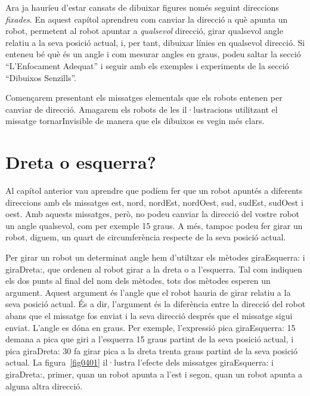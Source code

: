 Ara ja hauríeu d'estar cansats de dibuixar figures només seguint direccions \emph{fixades}. En aquest capítol aprendreu com canviar la direcció a què apunta un robot, permetent al robot apuntar a \emph{qualsevol} direcció, girar qualsevol angle relatiu a la seva posició actual, i, per tant, dibuixar línies en qualsevol direcció. Si enteneu bé què és un angle i com mesurar angles en graus, podeu saltar la secció ``L'Enfocament Adequat'' i seguir amb els exemples i experiments de la secció ``Dibuixos Senzills''.

Començarem presentant els missatges elementals que els robots entenen per canviar de direcció. Amagarem els robots de les il·lustracions utilitzant el missatge \textsf{tornarInvisible} de manera que els dibuixos es vegin més clars.

\section{Dreta o esquerra?}
Al capítol anterior vau aprendre que podíem fer que un robot apuntés a diferents direccions amb els missatges \textsf{est}, \textsf{nord}, \textsf{nordEst}, \textsf{nordOest}, \textsf{sud}, \textsf{sudEst}, \textsf{sudOest} i \textsf{oest}. Amb aquests missatges, però, no podeu canviar la direcció del vostre robot un angle qualsevol, com per exemple 15 graus. A més, tampoc podeu fer girar un robot, diguem, un quart de circumferència respecte de la seva posició actual.

Per girar un robot un determinat angle hem d'utiltzar els mètodes \textsf{giraEsquerra:} i \textsf{giraDreta:}, que ordenen al robot girar a la dreta o a l'esquerra. Tal com indiquen els dos punts al final del nom dels mètodes, tots dos mètodes esperen un argument. Aquest argument és l'angle que el robot hauria de girar relatiu a la seva posició actual. És a dir, l'argument és la diferència entre la direcció del robot abans que el missatge fos enviat i la seva direcció després que el missatge sigui enviat. L'angle es dóna en graus. Per exemple, l'expressió \textsf{pica giraEsquerra: 15} demana a \textsf{pica} que giri a l'esquerra 15 graus partint de la seva posició actual, i \textsf{pica giraDreta: 30} fa girar \textsf{pica} a la dreta trenta graus partint de la seva posició actual. La figura~\ref{fig0401} il·lustra l'efecte dels missatges \textsf{giraEsquerra:} i \textsf{giraDreta:}, primer, quan un robot apunta a l'\textsf{est} i segon, quan un robot apunta a alguna altra direcció. 

